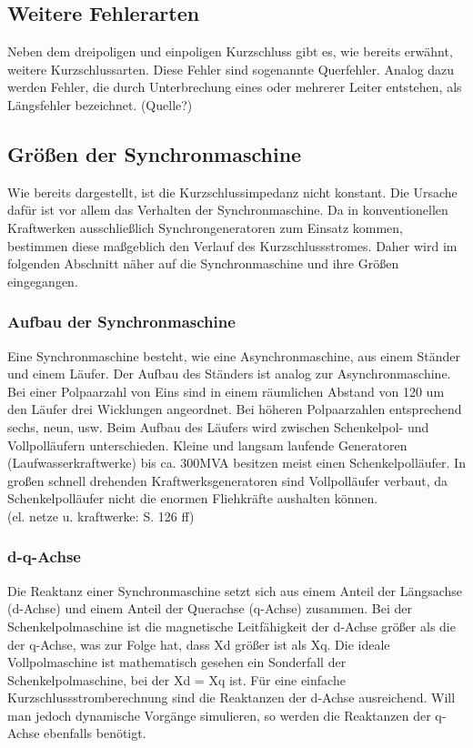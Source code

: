 \documentclass{scrartcl}
\begin{document}
\begin{onehalfspace}
\subsection{Weitere Fehlerarten}
Neben dem dreipoligen und einpoligen Kurzschluss gibt es, wie bereits erwähnt, weitere Kurzschlussarten. Diese Fehler sind sogenannte \glqq Querfehler\grqq{}. Analog dazu werden Fehler, die durch Unterbrechung eines oder mehrerer Leiter entstehen, als \glqq Längsfehler\grqq{} bezeichnet. (Quelle?)

\subsection{Größen der Synchronmaschine}
Wie bereits dargestellt, ist die Kurzschlussimpedanz nicht konstant. Die Ursache dafür ist vor allem das Verhalten der Synchronmaschine. Da in konventionellen Kraftwerken ausschließlich Synchrongeneratoren zum Einsatz kommen, bestimmen diese maßgeblich den Verlauf des Kurzschlussstromes. Daher wird im folgenden Abschnitt näher auf die Synchronmaschine und ihre Größen eingegangen.

\subsubsection{Aufbau der Synchronmaschine}
Eine Synchronmaschine besteht, wie eine Asynchronmaschine, aus einem Ständer und einem Läufer. Der Aufbau des Ständers ist analog zur Asynchronmaschine. Bei einer Polpaarzahl von Eins sind in einem räumlichen Abstand von 120\degree{} um den Läufer drei Wicklungen angeordnet. Bei höheren Polpaarzahlen entsprechend sechs, neun, usw. Beim Aufbau des Läufers wird zwischen Schenkelpol- und Vollpolläufern unterschieden. Kleine und langsam laufende Generatoren (Laufwasserkraftwerke) bis ca. 300MVA besitzen meist einen Schenkelpolläufer. In großen schnell drehenden Kraftwerksgeneratoren sind Vollpolläufer verbaut, da Schenkelpolläufer nicht die enormen Fliehkräfte aushalten können. 
\\ (el. netze u. kraftwerke: S. 126 ff)

\subsubsection{d-q-Achse}
Die Reaktanz einer Synchronmaschine setzt sich aus einem Anteil der Längsachse (d-Achse) und einem Anteil der Querachse (q-Achse) zusammen. Bei der Schenkelpolmaschine ist die magnetische Leitfähigkeit der d-Achse größer als die der q-Achse, was zur Folge hat, dass Xd größer ist als Xq. Die ideale Vollpolmaschine ist mathematisch gesehen ein Sonderfall der Schenkelpolmaschine, bei der Xd = Xq ist. Für eine einfache Kurzschlussstromberechnung sind die Reaktanzen der d-Achse ausreichend. Will man jedoch dynamische Vorgänge simulieren, so werden die Reaktanzen der q-Achse ebenfalls benötigt. \\


\end{onehalfspace}
\end{document}
